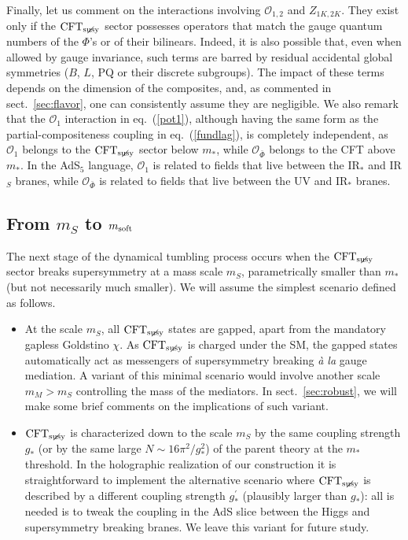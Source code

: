\documentclass[a4paper,12pt]{article}
\def\eq#1{eq.~(\ref{#1})}
\def\eq#1{eq.~(\ref{#1})}
\def\sec#1{sect.~\ref{#1}}
\def\O{\mathcal{O}}
\def\mst{m_*}
\def\mS{m_S}
\def\CFTs{{\rm CFT}_ {{\rm susy}\! \! \! \! \! \! \! \!\diagup \,\,\,}}
\begin{document}
Finally, let us comment on the interactions involving $\O_{1,2}$ and $Z_{1K,2K}$. They exist only if the $\CFTs$ sector possesses operators that match the gauge quantum numbers of the $\Phi$'s or of their bilinears. Indeed, it is also possible that, even when allowed by gauge invariance, such terms are barred by residual accidental global symmetries ($B$, $L$, PQ or their discrete subgroups). The impact of these terms  depends on the dimension of the composites,  and, as commented in \sec{sec:flavor}, one can consistently assume they are negligible. We also remark that the $\O_1$ interaction in \eq{pot1}, although having the same form as the partial-compositeness coupling in \eq{fundlag}, is completely independent, as $\O_1$ belongs to the $\CFTs$ sector below $\mst$, while $\O_{\bar \Phi}$ belongs to the CFT above $\mst$. In the AdS$_5$ language, $\O_1$ is related to fields that live between the IR$_*$ and IR$_S$ branes, while $\O_{\bar \Phi}$ is related to fields that live between the UV and IR$_*$ branes.

\boldmath
\subsection{From $\mS$ to $m_{\rm soft}$}
\unboldmath
\label{sec:fromstosoft}

The next stage of the dynamical tumbling process occurs when the $\CFTs$  sector breaks supersymmetry at a mass scale $\mS$, parametrically smaller than $\mst$ (but not necessarily much smaller). We will assume   the simplest  scenario defined as follows.
\begin{itemize}
\item  At the scale $\mS$, all  
$\CFTs$ states are gapped, apart from the mandatory gapless Goldstino $\chi$. As $\CFTs$ is charged under the SM, the gapped states automatically act as messengers of supersymmetry breaking {\it {\`a la}} gauge mediation. A variant of this minimal scenario would involve another scale $m_M>\mS$ controlling the mass of the mediators. In \sec{sec:robust}, we will make some brief comments on the implications of such variant.
\item $\CFTs$ is characterized down to the scale $\mS$ by the same coupling strength $g_*$ (or by the same large $N\sim 16\pi^2/g_*^2$)
of  the parent theory at the $\mst$ threshold. In the holographic realization of our construction it is straightforward to implement the alternative scenario where $\CFTs$ is described by a different coupling strength $g_*^\prime$ (plausibly larger than $g_*$): all is needed is to tweak the coupling in the AdS slice between the Higgs and supersymmetry breaking branes. We leave this variant for future study.
\end{itemize} 
\end{document}
